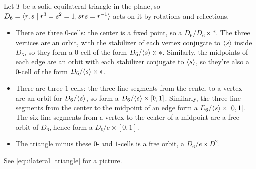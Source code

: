 \begin{exm}
\label{triangle_exm}
Let $T$ be a solid equilateral triangle in the plane, so $D_6 = \langle r,s\mid r^3 = s^2 = 1, srs = r^{-1}\rangle$ acts on
it by rotations and reflections.
\begin{itemize}
	\item There are three $0$-cells: the center is a fixed point, so a $D_6/D_6\times *$. The three vertices are
	an orbit, with the stabilizer of each vertex conjugate to $\langle s\rangle$ inside $D_6$, so they form a $0$-cell of the
	form $D_6/\langle s\rangle\times *$. Similarly, the midpoints of each edge are an orbit with each stabilizer conjugate to
	$\langle s\rangle$, so they're also a $0$-cell of the form $D_6/\langle s\rangle\times *$.
	\item There are three $1$-cells: the three line segments from the center to a vertex are an orbit for $D_6/\langle s\rangle$, so form a $D_6/\langle s\rangle\times[0,1]$. Similarly, the three line segments from the center to the midpoint of an
	edge form a $D_6/\langle s\rangle\times[0,1]$. The six line segments from a vertex to the center of a midpoint are a free
	orbit of $D_6$, hence form a $D_6/e\times[0,1]$.
	\item The triangle minus these $0$- and $1$-cells is a free orbit, a $D_6/e\times D^2$.
\end{itemize}
See \cref{equilateral_triangle} for a picture.
\end{exm}

